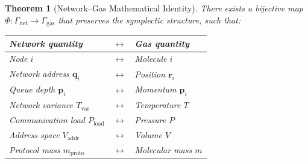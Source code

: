 \documentclass[11pt,twocolumn,a4paper]{article}
\newtheorem{theorem}{Theorem}[section]
\theoremstyle{definition}
\theoremstyle{remark}
\newcommand{\Tvar}{T_{\mathrm{var}}}
\newcommand{\Pload}{P_{\mathrm{load}}}
\newcommand{\Vaddr}{V_{\mathrm{addr}}}
\newcommand{\mpr}{m_{\mathrm{proto}}}
\begin{document}
\begin{theorem}[Network--Gas Mathematical Identity]\label{thm:isomorphism}
There exists a bijective map
$\Phi:\Gamma_{\mathrm{net}}\to\Gamma_{\mathrm{gas}}$ that preserves the
symplectic structure, such that:
\begin{center}
\begin{tabular}{lcl}
\toprule
\textbf{Network quantity} & $\boldsymbol{\longleftrightarrow}$ &
\textbf{Gas quantity} \\
\midrule
Node $i$ & $\leftrightarrow$ & Molecule $i$ \\
Network address $\bm{q}_i$ & $\leftrightarrow$ & Position $\bm{r}_i$ \\
Queue depth $\bm{p}_i$ & $\leftrightarrow$ & Momentum $\bm{p}_i$ \\
Network variance $\Tvar$ & $\leftrightarrow$ & Temperature $T$ \\
Communication load $\Pload$ & $\leftrightarrow$ & Pressure $P$ \\
Address space $\Vaddr$ & $\leftrightarrow$ & Volume $V$ \\
Protocol mass $\mpr$ & $\leftrightarrow$ & Molecular mass $m$ \\
\bottomrule
\end{tabular}
\end{center}
\end{theorem}
\end{document}

